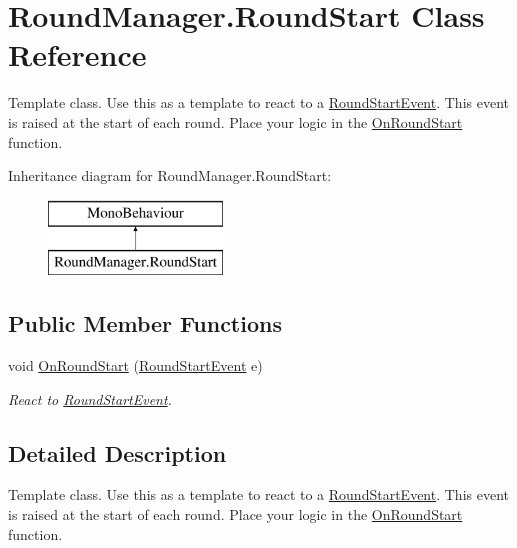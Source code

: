 \hypertarget{class_round_manager_1_1_round_start}{}\section{Round\+Manager.\+Round\+Start Class Reference}
\label{class_round_manager_1_1_round_start}


Template class. Use this as a template to react to a \hyperlink{class_round_manager_1_1_events_1_1_round_start_event}{Round\+Start\+Event}. This event is raised at the start of each round. Place your logic in the \hyperlink{class_round_manager_1_1_round_start_adbe6efdca2f652400ee7afe113a7645b}{On\+Round\+Start} function.  


Inheritance diagram for Round\+Manager.\+Round\+Start\+:\begin{figure}[H]
\begin{center}
\leavevmode
\includegraphics[height=2.000000cm]{class_round_manager_1_1_round_start}
\end{center}
\end{figure}
\subsection*{Public Member Functions}
\begin{DoxyCompactItemize}
\item 
void \hyperlink{class_round_manager_1_1_round_start_adbe6efdca2f652400ee7afe113a7645b}{On\+Round\+Start} (\hyperlink{class_round_manager_1_1_events_1_1_round_start_event}{Round\+Start\+Event} e)
\begin{DoxyCompactList}\small\item\em React to \hyperlink{class_round_manager_1_1_events_1_1_round_start_event}{Round\+Start\+Event}. \end{DoxyCompactList}\end{DoxyCompactItemize}


\subsection{Detailed Description}
Template class. Use this as a template to react to a \hyperlink{class_round_manager_1_1_events_1_1_round_start_event}{Round\+Start\+Event}. This event is raised at the start of each round. Place your logic in the \hyperlink{class_round_manager_1_1_round_start_adbe6efdca2f652400ee7afe113a7645b}{On\+Round\+Start} function. 



